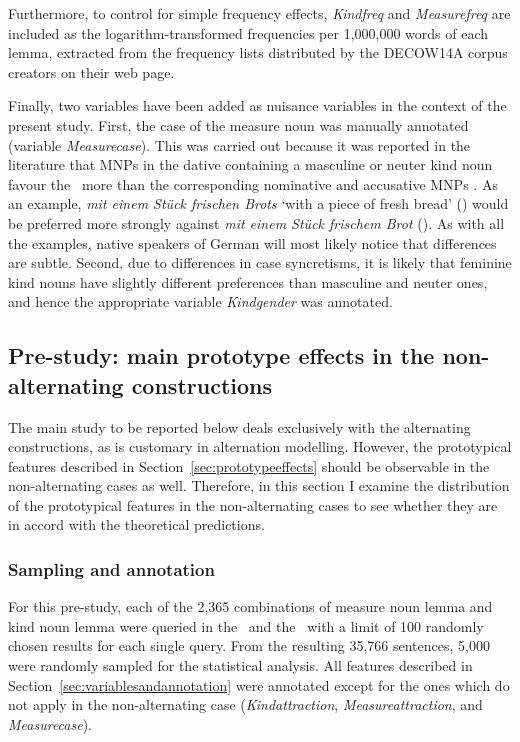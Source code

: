 Furthermore, to control for simple frequency effects, \textit{Kindfreq} and \textit{Measurefreq} are included as the logarithm-transformed frequencies per 1,000,000 words of each lemma, extracted from the frequency lists distributed by the DECOW14A corpus creators on their web page.

Finally, two variables have been added as nuisance variables in the context of the present study.
First, the case of the measure noun was manually annotated (variable \textit{Measurecase}).
This was carried out because it was reported in the literature that MNPs in the dative containing a masculine or neuter kind noun favour the \PGCa\ more than the corresponding nominative and accusative MNPs \citep{Hentschel1993,Zimmer2015}.
As an example, \textit{mit einem Stück frischen Brots} `with a piece of fresh bread' (\PGCa) would be preferred more strongly against \textit{mit einem Stück frischem Brot} (\NACa).
As with all the examples, native speakers of German will most likely notice that differences are subtle.
Second, due to differences in case syncretisms, it is likely that feminine kind nouns have slightly different preferences than masculine and neuter ones, and hence the appropriate variable \textit{Kindgender} was annotated.

\subsection{Pre-study: main prototype effects in the non-alternating constructions}
\label{sec:prestudy}

The main study to be reported below deals exclusively with the alternating constructions, as is customary in alternation modelling.
However, the prototypical features described in Section~\ref{sec:prototypeeffects} should be observable in the non-alternating cases as well.
Therefore, in this section I examine the distribution of the prototypical features in the non-alternating cases to see whether they are in accord with the theoretical predictions.

\subsubsection{Sampling and annotation}

For this pre-study, each of the 2,365 combinations of measure noun lemma and kind noun lemma were queried in the \NACb\ and the \PGCd\ with a limit of 100 randomly chosen results for each single query.
From the resulting 35,766 sentences, 5,000 were randomly sampled for the statistical analysis.
All features described in Section~\ref{sec:variablesandannotation} were annotated except for the ones which do not apply in the non-alternating case (\textit{Kindattraction}, \textit{Measureattraction}, and \textit{Measurecase}).

